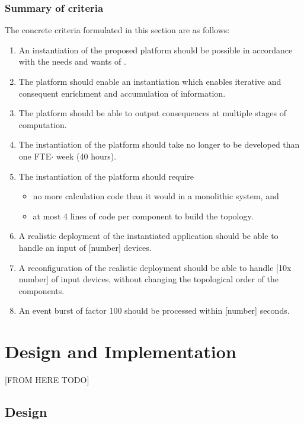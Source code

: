 \subsubsection{Summary of criteria}
The concrete criteria formulated in this section are as follows:
\begin{enumerate}
\nospace
\item An instantiation of the proposed platform should be possible in accordance with the needs and wants of \idsystems.
\item The platform should enable an instantiation which enables iterative and consequent enrichment and accumulation of information.
\item The platform should be able to output consequences at multiple stages of computation.
\item The instantiation of the platform should take no longer to be developed than one FTE$\cdot$ week (40 hours).
\item The instantiation of the platform should require 
\begin{itemize}
\item no more calculation code than it would in a monolithic system, and
\item at most 4 lines of code per component to build the topology.
\end{itemize}
\item A realistic deployment of the instantiated application should be able to handle an input of [number] devices.
\item A reconfiguration of the realistic deployment should be able to handle [10x number] of input devices, without changing the topological order of the components.
\item An event burst of factor 100 should be processed within [number] seconds.
\end{enumerate}


	
\section{Design and Implementation}
[FROM HERE TODO]

\subsection{Design}
